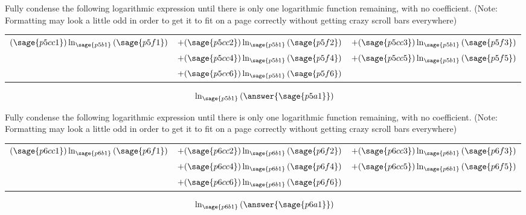\documentclass{ximera}
\begin{document}
\begin{problem}
    Fully condense the following logarithmic expression until there is only one logarithmic function remaining, with no coefficient. (Note: Formatting may look a little odd in order to get it to fit on a page correctly without getting crazy scroll bars everywhere)
    
    \begin{tabular}{lll}
        $(\sage{p5cc1})\logOld_{\sage{p5b1}}\left(\sage{p5f1}\right)$& $+ 
        (\sage{p5cc2})\logOld_{\sage{p5b1}}\left(\sage{p5f2}\right)$&$ + 
        (\sage{p5cc3})\logOld_{\sage{p5b1}}\left(\sage{p5f3}\right)$ \\
        &$+(\sage{p5cc4})\logOld_{\sage{p5b1}}\left(\sage{p5f4}\right)$&$ + 
        (\sage{p5cc5})\logOld_{\sage{p5b1}}\left(\sage{p5f5}\right)$ \\
        &$ + (\sage{p5cc6})\logOld_{\sage{p5b1}}\left(\sage{p5f6}\right)$
    \end{tabular}
    \[
        \logOld_{\sage{p5b1}}\left( \answer{\sage{p5a1}} \right)
    \]
\end{problem}



\begin{problem}
    Fully condense the following logarithmic expression until there is only one logarithmic function remaining, with no coefficient. (Note: Formatting may look a little odd in order to get it to fit on a page correctly without getting crazy scroll bars everywhere)
    
    \begin{tabular}{lll}
        $(\sage{p6cc1})\logOld_{\sage{p6b1}}\left(\sage{p6f1}\right)$& $+ 
        (\sage{p6cc2})\logOld_{\sage{p6b1}}\left(\sage{p6f2}\right)$&$ + 
        (\sage{p6cc3})\logOld_{\sage{p6b1}}\left(\sage{p6f3}\right)$ \\
        &$+(\sage{p6cc4})\logOld_{\sage{p6b1}}\left(\sage{p6f4}\right)$&$ + 
        (\sage{p6cc5})\logOld_{\sage{p6b1}}\left(\sage{p6f5}\right)$ \\
        &$ + (\sage{p6cc6})\logOld_{\sage{p6b1}}\left(\sage{p6f6}\right)$
    \end{tabular}
    \[
        \logOld_{\sage{p6b1}}\left( \answer{\sage{p6a1}} \right)
    \]
\end{problem}
\end{document}
